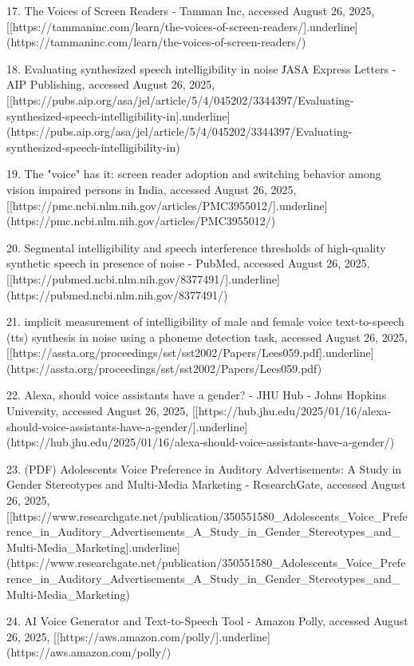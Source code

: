 17. The Voices of Screen Readers - Tamman Inc, accessed August 26, 2025,
    [[https://tammaninc.com/learn/the-voices-of-screen-readers/]{.underline}](https://tammaninc.com/learn/the-voices-of-screen-readers/)

18. Evaluating synthesized speech intelligibility in noise \| JASA
    Express Letters - AIP Publishing, accessed August 26, 2025,
    [[https://pubs.aip.org/asa/jel/article/5/4/045202/3344397/Evaluating-synthesized-speech-intelligibility-in]{.underline}](https://pubs.aip.org/asa/jel/article/5/4/045202/3344397/Evaluating-synthesized-speech-intelligibility-in)

19. The "voice" has it: screen reader adoption and switching behavior
    among vision impaired persons in India, accessed August 26, 2025,
    [[https://pmc.ncbi.nlm.nih.gov/articles/PMC3955012/]{.underline}](https://pmc.ncbi.nlm.nih.gov/articles/PMC3955012/)

20. Segmental intelligibility and speech interference thresholds of
    high-quality synthetic speech in presence of noise - PubMed,
    accessed August 26, 2025,
    [[https://pubmed.ncbi.nlm.nih.gov/8377491/]{.underline}](https://pubmed.ncbi.nlm.nih.gov/8377491/)

21. implicit measurement of intelligibility of male and female voice
    text-to-speech (tts) synthesis in noise using a phoneme detection
    task, accessed August 26, 2025,
    [[https://assta.org/proceedings/sst/sst2002/Papers/Lees059.pdf]{.underline}](https://assta.org/proceedings/sst/sst2002/Papers/Lees059.pdf)

22. Alexa, should voice assistants have a gender? - JHU Hub - Johns
    Hopkins University, accessed August 26, 2025,
    [[https://hub.jhu.edu/2025/01/16/alexa-should-voice-assistants-have-a-gender/]{.underline}](https://hub.jhu.edu/2025/01/16/alexa-should-voice-assistants-have-a-gender/)

23. (PDF) Adolescents Voice Preference in Auditory Advertisements: A
    Study in Gender Stereotypes and Multi-Media Marketing -
    ResearchGate, accessed August 26, 2025,
    [[https://www.researchgate.net/publication/350551580_Adolescents_Voice_Preference_in_Auditory_Advertisements_A_Study_in_Gender_Stereotypes_and_Multi-Media_Marketing]{.underline}](https://www.researchgate.net/publication/350551580_Adolescents_Voice_Preference_in_Auditory_Advertisements_A_Study_in_Gender_Stereotypes_and_Multi-Media_Marketing)

24. AI Voice Generator and Text-to-Speech Tool - Amazon Polly, accessed
    August 26, 2025,
    [[https://aws.amazon.com/polly/]{.underline}](https://aws.amazon.com/polly/)

